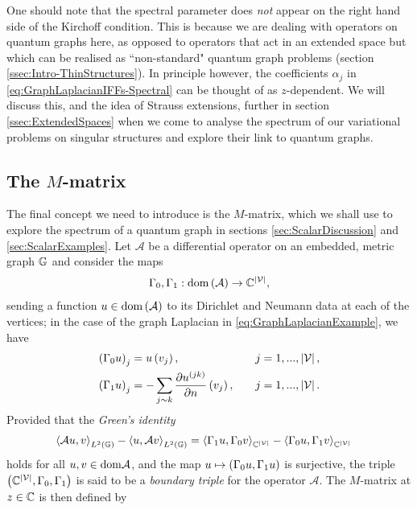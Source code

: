 One should note that the spectral parameter does \emph{not} appear on the right hand side of the Kirchoff condition.
This is because we are dealing with operators on quantum graphs here, as opposed to operators that act in an extended space but which can be realised as ``non-standard" quantum graph problems (section \ref{ssec:Intro-ThinStructures}).
In principle however, the coefficients $\alpha_j$ in \eqref{eq:GraphLaplacianIFFs-Spectral} can be thought of as $z$-dependent.
We will discuss this, and the idea of Strauss extensions, further in section \ref{ssec:ExtendedSpaces} when we come to analyse the spectrum of our variational problems on singular structures and explore their link to quantum graphs.


\subsection{The $M$-matrix} \label{ssec:MMatrix}
The final concept we need to introduce is the $M$-matrix, which we shall use to explore the spectrum of a quantum graph in sections \ref{sec:ScalarDiscussion} and \ref{sec:ScalarExamples}.
Let $\mathcal{A}$ be a differential operator on an embedded, metric graph $\mathbb{G}$ and consider the maps
\begin{align*}
	\Gamma_0, \Gamma_1: \mathrm{dom}\left( \mathcal{A} \right) \rightarrow \mathbb{C}^{\left\lvert \mathcal{V} \right\rvert},
\end{align*}
sending a function $u\in\mathrm{dom}\left( \mathcal{A} \right)$ to its Dirichlet and Neumann data at each of the vertices; in the case of the graph Laplacian in \eqref{eq:GraphLaplacianExample}, we have
\begin{align} \label{eq:GraphDNMapDef}
	\left( \Gamma_0 u \right)_j &= u\left( v_j \right), \quad &j=1,...,\left\lvert \mathcal{V} \right\rvert, \\
	\left( \Gamma_1 u \right)_j &= -\sum_{j\sim k}\dfrac{\partial u^{(jk)}}{\partial n}\left( v_j \right), \quad &j=1,...,\left\lvert \mathcal{V} \right\rvert. 
\end{align}
Provided that the \emph{Green's identity}
\begin{align} \label{eq:GraphGreensIdentity}
	\left\langle \mathcal{A}u , v \right\rangle_{L^2\left( \mathbb{G} \right)} - \left\langle u , \mathcal{A}v \right\rangle_{L^2\left( \mathbb{G} \right)}
	&= \left\langle \Gamma_1 u , \Gamma_0 v \right\rangle_{\mathbb{C}^{\left\lvert \mathcal{V} \right\rvert}} - \left\langle \Gamma_0 u , \Gamma_1 v \right\rangle_{\mathbb{C}^{\left\lvert \mathcal{V} \right\rvert}}
\end{align}
holds for all $u,v\in\mathrm{dom}\mathcal{A}$, and the map $u\mapsto\left( \Gamma_0 u, \Gamma_1 u \right)$ is surjective, the triple $\left( \mathbb{C}^{\left\lvert \mathcal{V} \right\rvert},\Gamma_0,\Gamma_1 \right)$ is said to be a \emph{boundary triple} for the operator $\mathcal{A}$.
The $M$-matrix at $z\in\mathbb{C}$ is then defined by
